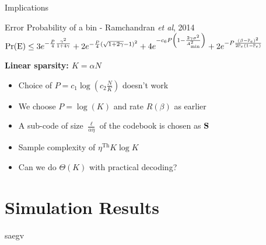\documentclass[10pt]{beamer}
\begin{document}
\begin{frame}{Implications}
\begin{block}{Error Probability of a bin - Ramchandran \textit{et al}, 2014}
$\text{Pr(E)}\leq 3e^{-\frac{P}{4}\frac{\gamma^2}{1+4 \gamma}}+2e^{-\frac{P}{4}(\sqrt{1+2\gamma}-1)^2}+4e^{-c_6 P\left(1-\frac{2\gamma\sigma^2}{A^{2}_{\text{min}}}\right)}+2e^{-P\frac{\left(\beta-\mathbb{P}_{e}\right)^2}{2\mathbb{P}_{e}(1-\mathbb{P}_{e})}}$
\end{block}

\vspace{2ex}
\begin{description}
    \item [\textbf{Linear sparsity: $K=\alpha N$}]
\end{description}
\begin{itemize}
\item Choice of $P=c_{1}\log\left(c_2 \frac{N}{K}\right)$ doesn't work
\item We choose $P=\log(K)$ and rate $R(\beta)$ as earlier
\item A sub-code of size $\frac{\ell}{\alpha\eta}$ of the codebook is chosen as $\mathbf{S}$
\item Sample complexity of $\eta^{\text{Th}}K\log K$
\item Can we do $\Theta(K)$ with practical decoding?
\end{itemize}

\end{frame}

\section{Simulation Results}
\begin{frame}
saegv
\end{frame}
\end{document}
